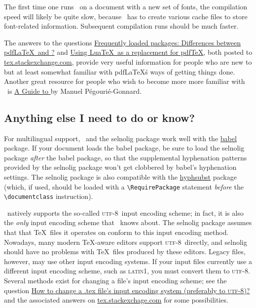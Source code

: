 \documentclass[11pt]{article}
\newcommand{\pkg}[1]{\textsf{#1}}
\newcommand\utf{\textsc{utf-8}}
\begin{document}
The first time one runs \LuaLaTeX\ on a document with a new set of fonts, the compilation speed will likely be quite slow, because \LuaLaTeX\ has to create various cache files to store font-related information. Subsequent compilation runs should be much faster. 

The answers to the questions \href{http://tex.stackexchange.com/q/28642/5001}{Frequently loaded packages: Differences between pdf\LaTeX\ and \LuaLaTeX?} and \href{http://tex.stackexchange.com/q/32295/5001}{Using Lua\TeX\ as a replacement for pdf\TeX}, both posted to \href{http://tex.stackexchange.com/}{tex.stackexchange.com}, provide very useful information for people who are new to \LuaLaTeX but at least somewhat familiar with pdf\LaTeX\'s ways of getting things done. Another great resource for people who wish to become more more familiar with \LuaLaTeX\ is \href{http://mirror.ctan.org/info/luatex/lualatex-doc/lualatex-doc.pdf}{A Guide to \LuaLaTeX} by Manuel Pégourié-Gonnard.


\subsection{Anything else I need to do or know?} \label{sec:anythingelse}

For multilingual support, \LuaLaTeX\ and the \pkg{selnolig} package work well with the \href{http://www.ctan.org/pkg/babel}{\pkg{babel}} package. If your document loads the \pkg{babel} package, be sure to load the \pkg{selnolig} package \emph{after} the \pkg{babel} package, so that the supplemental hyphenation patterns provided by the \pkg{selnolig} package won't get clobbered by \pkg{babel}'s hyphenation settings. The \pkg{selnolig} package is also compatible with the \href{http://www.ctan.org/pkg/hyphsubst}{\pkg{hyphsubst}} package (which, if used, should be loaded with a \Verb+\RequirePackage+ statement \emph{before} the \Verb+\documentclass+ instruction).

\LuaLaTeX\ natively supports the so-called \utf\ input encoding scheme; in fact, it is also the \emph{only} input encoding scheme that \LuaLaTeX\ knows about. The \pkg{selnolig} package assumes that that \TeX\ files it operates on conform to this input encoding method. Nowadays, many modern \TeX-aware editors support \utf\ directly, and \pkg{selnolig} should have no problems with \TeX\ files produced by these editors. Legacy files, however, may use other input encoding systems. If your input files currently use a different input encoding scheme, such as \textsc{latin1}, you must convert them to \utf. Several methods exist for changing a file's input encoding scheme; see the question \href{http://tex.stackexchange.com/q/87406/5001}{How to change a .tex file's input encoding system (preferably to \utf)?} and the associated answers on \url{tex.stackexchage.com} for some possibilities.
\end{document}
